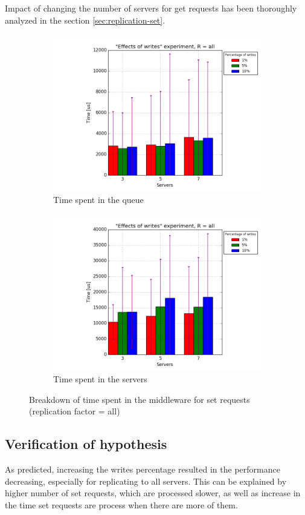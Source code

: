 \documentclass[11pt]{article}
\begin{document}
Impact of changing the number of servers for get requests has been thoroughly analyzed in the section \ref{sec:replication-set}.

\begin{figure}
\centering
\begin{subfigure}{.5\textwidth}
	\centering
	\includegraphics[width=\linewidth]{plots/writes-set-queue-2-replication}
	\caption{Time spent in the queue}
	\label{fig:writes-set-queue-2}
\end{subfigure}%
\begin{subfigure}{.5\textwidth}
	\centering
	\includegraphics[width=\linewidth]{plots/writes-set-servers-2-replication}
	\caption{Time spent in the servers}
	\label{fig:writes-set-servers-2}
\end{subfigure}
\caption{Breakdown of time spent in the middleware for set requests (replication factor = all)}
\label{fig:writes-set-breakdown-2}
\end{figure}

\subsection{Verification of hypothesis}
As predicted, increasing the writes percentage resulted in the performance decreasing, especially for replicating to all servers. This can be explained by higher number of set requests, which are processed slower, as well as increase in the time set requests are process when there are more of them. 
 
\end{document}
